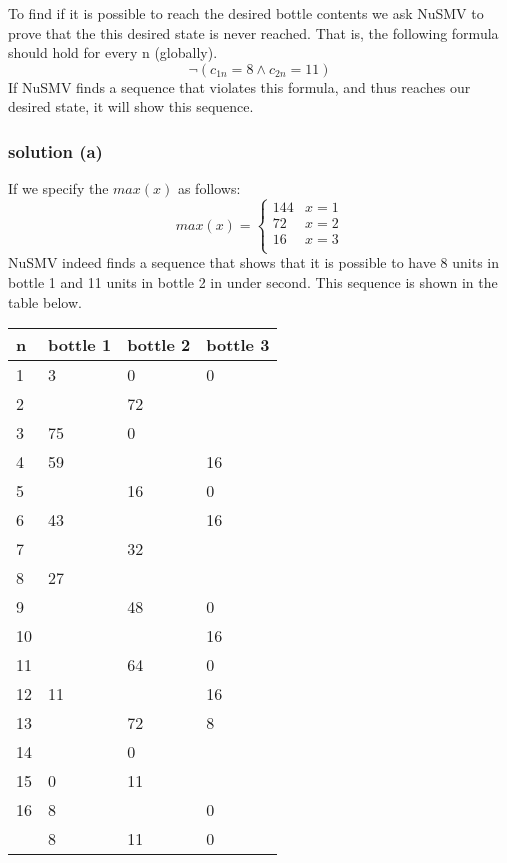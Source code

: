 \documentclass[12pt]{article}
\begin{document}
\vspace{3mm}

To find if it is possible to reach the desired bottle contents we ask NuSMV to 
prove that the this desired state is never reached. That is, the following 
formula should hold for every n (globally).
\begin{equation} \label{eq:ltlspec}
    \neg (c_{1n} = 8 \wedge c_{2n} = 11)
\end{equation}
If NuSMV finds a sequence that violates this formula, and thus reaches our
desired state, it will show this sequence. 

\subsubsection*{solution (a)}
If we specify the $max(x)$ as follows:
\begin{equation*}
max(x) = 
    \begin{cases}
        144 & x = 1\\  
        72  & x = 2\\  
        16  & x = 3\\  
    \end{cases}
\end{equation*}
NuSMV indeed finds a sequence that shows that it is possible to have 8 units in 
bottle 1 and 11 units in bottle 2 in under second. This sequence is shown
in the table below.

\begin{tabular}{|l|l|l|l|}
    \hline  
    n & bottle 1    & bottle 2  & bottle 3  \\  
    \hline \hline
    1 & 3   & 0     & 0 \\  
    2 &     & 72    &   \\  
    3 & 75  & 0     &   \\      
    4 & 59  &       & 16 \\  
    5 &     & 16    & 0 \\  
    6 & 43  &       & 16 \\  
    7 &     & 32    &   \\  
    8 & 27  &       &   \\  
    9 &     & 48    & 0 \\  
    10&     &       & 16 \\  
    11&     & 64    & 0 \\  
    12& 11  &       & 16 \\  
    13&     & 72    & 8 \\  
    14&     & 0     &   \\  
    15& 0   & 11    &   \\  
    16& 8   &       & 0 \\  
    \hline
      & 8   & 11    & 0 \\  
    \hline
\end{tabular}
\end{document}
